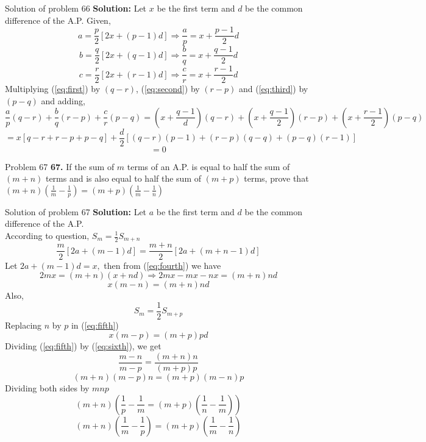 \documentclass[aspectratio=1610,8pt]{beamer}
\begin{document}
\begin{frame}{Solution of problem 66}
  \textbf{Solution:} Let $x$ be the first term and $d$ be the common difference
  of the A.P. Given,
  \begin{equation}\label{eq:first}
    a = \frac{p}{2}[2x + (p - 1)d] \Rightarrow \frac{a}{p} = x + \frac{p
      -1}{2}d
  \end{equation}
  \begin{equation}\label{eq:second}
    b = \frac{q}{2}[2x + (q - 1)d] \Rightarrow \frac{b}{q} = x + \frac{q
      -1}{2}d
  \end{equation}
  \begin{equation}\label{eq:third}
    c = \frac{r}{2}[2x + (r - 1)d] \Rightarrow \frac{c}{r} = x + \frac{r -
      1}{2}d
  \end{equation}
  Multiplying (\ref{eq:first}) by $(q - r)$, (\ref{eq:second}) by $(r - p)$ and
  (\ref{eq:third}) by $(p - q)$ and adding,
  $$\frac{a}{p}(q - r) + \frac{b}{q}(r - p) + \frac{c}{r}(p - q) = \left(x +
  \frac{q - 1}{d}\right)(q - r) + \left(x + \frac{q - 1}{2}\right)(r - p) +
  \left(x + \frac{r - 1}{2}\right)(p - q)$$
  $$= x[q - r + r - p + p - q] + \frac{d}{2}[(q - r)(p - 1) + (r - p)(q - q) +
    (p - q)(r - 1)]$$
  $$= 0$$
\end{frame}
\begin{frame}{Problem 67}
  \textbf{67.} If the sum of $m$ terms of an A.P. is equal to half the sum of
  $(m + n)$ terms and is also equal to half the sum of $(m + p)$ terms, prove
  that $(m + n)\left(\frac{1}{m} - \frac{1}{p}\right) = (m +
  p)\left(\frac{1}{m} - \frac{1}{n}\right)$
\end{frame}
\begin{frame}{Solution of problem 67}
  \textbf{Solution:} Let $a$ be the first term and $d$ be the common difference
  of the A.P.\\
  According to question, $S_m = \frac{1}{2}S_{m + n}$
  \setcounter{equation}{0}
  \begin{equation}\label{eq:fourth}
    \frac{m}{2}[2a + (m - 1)d] = \frac{m + n}{2}[2a + (m + n - 1)d]
  \end{equation}
  Let $2a + (m - 1)d = x,$ then from (\ref{eq:fourth}) we have
  $$2mx = (m + n)(x + nd)\Rightarrow 2mx - mx - nx = (m + n)nd$$
  \begin{equation}\label{eq:fifth}
    x(m - n) = (m + n)nd
  \end{equation}
  Also, $$S_m = \frac{1}{2}S_{m + p}$$
  Replacing $n$ by $p$ in (\ref{eq:fifth})
  \begin{equation}\label{eq:sixth}
    x(m - p) = (m + p)pd
  \end{equation}
  Dividing (\ref{eq:fifth}) by (\ref{eq:sixth}), we get
  $$\frac{m - n}{m - p} = \frac{(m + n)n}{(m + p)p}$$
  $$(m + n)(m - p)n = (m + p)(m - n)p$$
  Dividing both sides by $mnp$
  $$(m + n)\left(\frac{1}{p} - \frac{1}{m} = (m + p)\left(\frac{1}{n} -
  \frac{1}{m}\right)\right)$$
  $$(m + n)\left(\frac{1}{m} - \frac{1}{p}\right) = (m +
  p)\left(\frac{1}{m} - \frac{1}{n}\right)$$
\end{frame}
\end{document}
